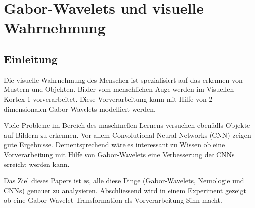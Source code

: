 %
%
%
\chapter{Gabor-Wavelets und visuelle Wahrnehmung\label{chapter:visuell}}
\begin{refsection}

\section{Einleitung}

Die visuelle Wahrnehmung des Menschen ist spezialisiert auf das erkennen von Mustern und Objekten.
Bilder vom menschlichen Auge werden im Visuellen Kortex 1 vorverarbeitet.
Diese Vorverarbeitung kann mit Hilfe von 2-dimensionalen Gabor-Wavelets modelliert werden.

Viele Probleme im Bereich des maschinellen Lernens versuchen ebenfalls Objekte auf Bildern zu erkennen.
Vor allem Convolutional Neural Networks (CNN) zeigen gute Ergebnisse.
Dementsprechend wäre es interessant zu Wissen ob eine Vorverarbeitung mit Hilfe von Gabor-Wavelets eine Verbesserung der CNNs erreicht werden kann.

Das Ziel dieses Papers ist es, alle diese Dinge (Gabor-Wavelets, Neurologie und CNNs) genauer zu analysieren.
Abschliessend wird in einem Experiment gezeigt ob eine Gabor-Wavelet-Transformation als Vorverarbeitung Sinn macht.









\printbibliography[heading=subbibliography]
\end{refsection}
